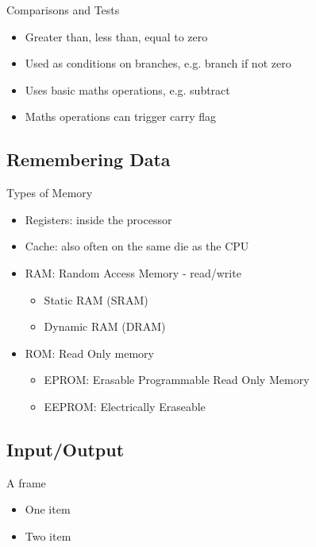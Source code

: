 \documentclass{beamer}
\begin{document}
\begin{frame}{Comparisons and Tests}
  \begin{itemize}
  \item
    Greater than, less than, equal to zero
  \item
    Used as conditions on branches, e.g. branch if not zero
  \item
    Uses basic maths operations, e.g. subtract
  \item
    Maths operations can trigger carry flag
  \end{itemize}
\end{frame}


\subsection[Memory]{Remembering Data}

\begin{frame}{Types of Memory}
  \begin{itemize}
  \item
    Registers: inside the processor
  \item
    Cache: also often on the same die as the CPU
  \item
    RAM: Random Access Memory - read/write
    \begin{itemize}
    \item
      Static RAM (SRAM)
    \item
      Dynamic RAM (DRAM)
    \end{itemize}
  \item
    ROM: Read Only memory
    \begin{itemize}
    \item
      EPROM: Erasable Programmable Read Only Memory
    \item
      EEPROM: Electrically Eraseable
    \end{itemize}
  \end{itemize}
\end{frame}

\subsection[IO]{Input/Output}

\begin{frame}{A frame}
  \begin{itemize}
  \item
    One item
  \item
    Two item
  \end{itemize}
\end{frame}
\end{document}
